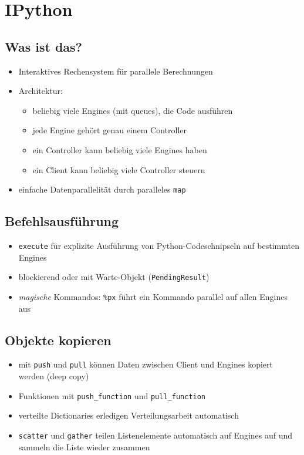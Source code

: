 \documentclass[a4paper, 12pt]{article}
\begin{document}
\section{IPython}


\subsection{Was ist das?}
\begin{itemize}
  \item Interaktives Rechensystem für parallele Berechnungen
  \item Architektur:
    \begin{itemize}
      \item beliebig viele Engines (mit queues), die Code ausführen
      \item jede Engine gehört genau einem Controller
      \item ein Controller kann beliebig viele Engines haben
      \item ein Client kann beliebig viele Controller steuern
    \end{itemize}
  \item einfache Datenparallelität durch paralleles \texttt{map}
\end{itemize}


\subsection{Befehlsausführung}
\begin{itemize}
  \item \texttt{execute} für explizite Ausführung von Python-Codeschnipseln auf bestimmten Engines
  \item blockierend oder mit Warte-Objekt (\texttt{PendingResult})
  \item \emph{magische} Kommandos: \texttt{\%px} führt ein Kommando parallel auf allen Engines aus
\end{itemize}

\subsection{Objekte kopieren}
\begin{itemize}
  \item mit \texttt{push} und \texttt{pull} können Daten zwischen Client und Engines kopiert werden (deep copy)
  \item Funktionen mit \texttt{push\_function} und \texttt{pull\_function}
  \item verteilte Dictionaries erledigen Verteilungsarbeit automatisch
  \item \texttt{scatter} und \texttt{gather} teilen Listenelemente automatisch auf Engines auf und sammeln die Liste wieder zusammen
\end{itemize}
\end{document}
